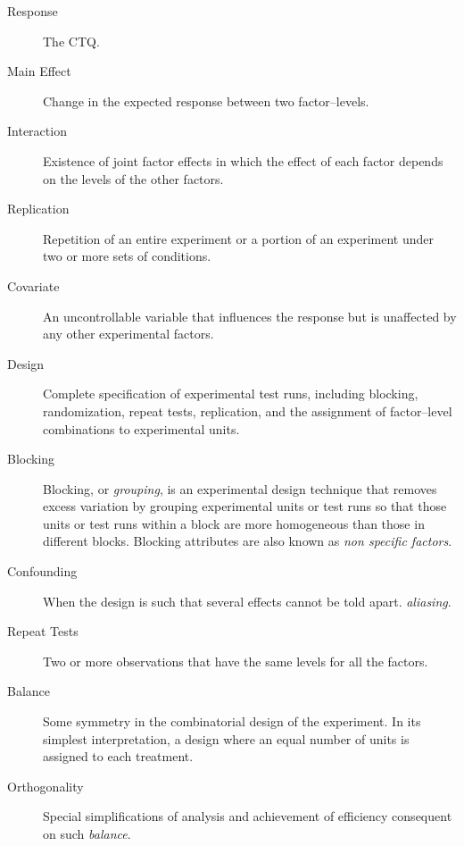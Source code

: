 \begin{description}
\item [Response] The CTQ.

\item [Main Effect] Change in the expected response between two factor–levels.  

\item [Interaction] Existence of joint factor effects in which the effect of each factor depends on the levels of the other factors.

\item [Replication] Repetition of an entire experiment or a portion of an experiment under two or more sets of conditions.

\item [Covariate]  An uncontrollable variable that influences the response but is
unaffected by any other experimental factors.

\item [Design]  Complete specification of experimental test runs, including blocking, randomization, repeat tests, replication, and the assignment of factor–level combinations to experimental units.

\item [Blocking]  Blocking, or \emph{grouping}, is an experimental design technique that removes excess variation by grouping experimental units or test runs so that those units or test runs within a block are more homogeneous than those in different blocks. Blocking attributes are also known as \emph{non specific factors}.

\item [Confounding] When the design is such that several effects cannot be told apart. \Aka \emph{aliasing}.

\item [Repeat Tests] Two or more observations that have the same levels for all the factors.

\item [Balance] Some symmetry in the combinatorial design of the experiment. In its simplest interpretation, a design where an equal number of units is assigned to each treatment.

\item [Orthogonality]  Special simplifications of analysis and achievement of efficiency consequent on such \emph{balance}.
\end{description}








